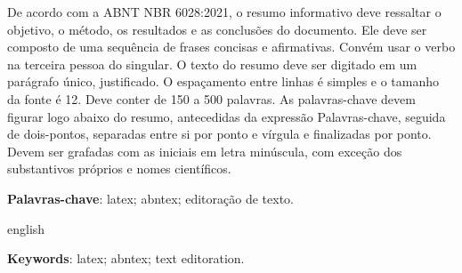 
\begin{resumo}
 De acordo com a ABNT NBR 6028:2021, o resumo informativo deve ressaltar o objetivo, o método, os resultados e as conclusões do documento. Ele deve ser composto de uma sequência de frases concisas e afirmativas. Convém usar o verbo na terceira pessoa do singular. O texto do resumo deve ser digitado em um parágrafo único, justificado. O espaçamento entre linhas é simples e o tamanho da fonte é 12. Deve conter de 150 a 500 palavras. As palavras-chave devem figurar logo abaixo do resumo, antecedidas da expressão Palavras-chave, seguida de dois-pontos, separadas entre si por ponto e vírgula e finalizadas por ponto. Devem ser grafadas com as iniciais em letra minúscula, com exceção dos substantivos próprios e nomes científicos.
 
\textbf{Palavras-chave}: latex; abntex; editoração de texto.

\end{resumo}


\begin{resumo}[Abstract]
 \begin{otherlanguage*}{english}
   \lipsum[150]

   \vspace{\onelineskip}
 
   \noindent 
   \textbf{Keywords}: latex; abntex; text editoration.
 \end{otherlanguage*}
\end{resumo}


 

  
